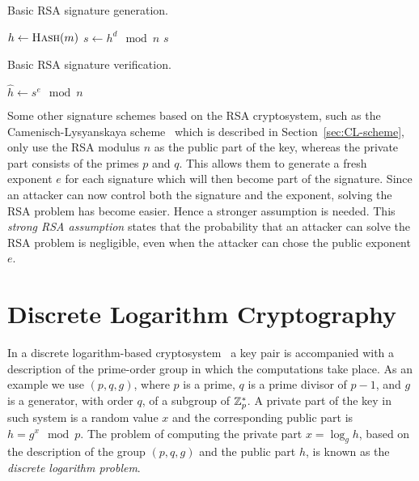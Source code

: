 \begin{algorithm}[H]
  \caption{Basic RSA signature generation.}
  \label{alg:RSA-sign}
  \addtolength{\baselineskip}{1mm}
  \begin{algorithmic}[1]
      \State $h \gets \Call{Hash}{m}$
      \State $s \gets h^d \mod n$
      \Return $s$
    \EndFunction
  \end{algorithmic}
\end{algorithm}
\begin{algorithm}[H]
  \caption{Basic RSA signature verification.}
  \label{alg:RSA-verify}
  \addtolength{\baselineskip}{1mm}
  \begin{algorithmic}[1]
      \State $\hat{h} \gets s^e \mod n$
        \Return {}
      \EndIf
      \Return {}
    \EndFunction
  \end{algorithmic}
\end{algorithm}

Some other signature schemes based on the RSA cryptosystem, such as the
Camenisch-Lysyanskaya scheme~\cite{CamenischLysyanskaya2003}
 which is described
in Section~\ref{sec:CL-scheme}, only use the RSA modulus $n$ as the public part
of the key, whereas the private part consists of the primes $p$ and $q$. This
allows them to generate a fresh exponent $e$ for each signature which will then
become part of the signature. Since an attacker can now control both the
signature and the exponent, solving the RSA problem has become easier. Hence a
stronger assumption is needed. This \emph{strong RSA assumption} states that the
probability that an attacker can solve the RSA problem is negligible, even when
the attacker can chose the public exponent $e$.

\section{Discrete Logarithm Cryptography}

In a discrete logarithm-based cryptosystem~\cite{DH1976,ElGamal1985} a key pair
is accompanied with a description of the prime-order group in which the
computations take place. As an example we use $(p, q, g)$, where $p$ is a prime,
$q$ is a prime divisor of $p-1$, and $g$ is a generator, with order $q$, of a
subgroup of $\mathbb{Z}^*_p$. A private part of the key in such system is a random value
$x$ and the corresponding public part is $h = g^x \mod p$. The problem of
computing the private part $x = \log_g h$, based on the description of the group
$(p, q, g)$ and the public part $h$, is known as the \emph{discrete logarithm
problem}.

